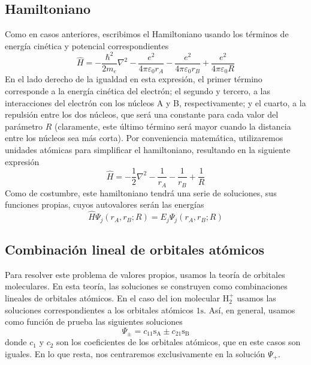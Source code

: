 \documentclass[notitlepage, amsmath,amssymb,
 aps,12pt,tightenlines]{revtex4-1}
\begin{document}
\subsection*{Hamiltoniano}
Como en casos anteriores, escribimos el Hamiltoniano usando los 
términos de energía cinética y potencial correspondientes
\begin{equation}
    \hat{H}=-\frac{\hbar^2}{2m_e}\nabla^2 -
    \frac{e^2}{4\pi \varepsilon_0r_A} - 
    \frac{e^2}{4\pi \varepsilon_0r_B} +
    \frac{e^2}{4\pi \varepsilon_0R} 
\end{equation}
En el lado derecho de la igualdad en esta expresión, el primer término
corresponde a la energía cinética del electrón; el segundo y tercero,
a las interacciones del electrón con los núcleos A y B, respectivamente;
y el cuarto, a la repulsión entre los dos núcleos, que será una
constante para cada valor del parámetro $R$ (claramente, este último
término será mayor cuando la distancia entre los núcleos sea más
corta). Por conveniencia matemática, utilizaremos unidades atómicas
para simplificar el hamiltoniano, resultando en la siguiente expresión
\begin{equation}
    \hat{H}=-\frac{1}{2}\nabla^2 -
    \frac{1}{r_A} - 
    \frac{1}{r_B} +
    \frac{1}{R} 
\end{equation}
Como de costumbre, este hamiltoniano tendrá una serie de soluciones, sus
funciones propias, cuyos autovalores serán las energías 
\begin{equation}
     \hat{H}\Psi_j(r_A, r_B; R) = E_j\Psi_j(r_A, r_B; R) 
     \label{eq:schrodinger}
\end{equation}

\subsection*{Combinación lineal de orbitales atómicos}
Para resolver este problema de valores propios, usamos la teoría 
de orbitales moleculares. En esta teoría, las soluciones se 
construyen como combinaciones lineales de orbitales atómicos.
En el caso del ion molecular H$_2^+$ usamos las soluciones 
correspondientes a los orbitales atómicos $1\mathrm{s}$.
Así, en general, usamos como función de prueba las siguientes
soluciones
\begin{equation}
    \Psi_\pm=c_11\mathrm{s_A} \pm c_21\mathrm{s_B}
    \label{eq:lcao}
\end{equation}
donde $c_1$ y $c_2$ son los coeficientes de los orbitales 
atómicos, que en este casos son iguales. En lo que resta, 
nos centraremos exclusivamente en la solución $\Psi_+$.
\end{document}
